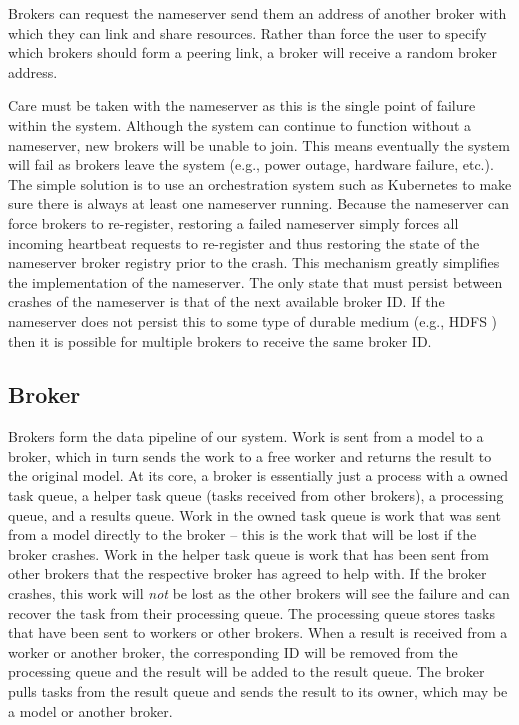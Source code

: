 \documentclass[conference]{IEEEtran}
\begin{document}
Brokers can request the nameserver send them an address of another broker with
which they can link and share resources. Rather than force the user to specify
which brokers should form a peering link, a broker will receive a random broker
address.

Care must be taken with the nameserver as this is the single point of failure
within the system. Although the system can continue to function without a
nameserver, new brokers will be unable to join. This means eventually the system
will fail as brokers leave the system (e.g., power outage, hardware failure, etc.).
The simple solution is to use an orchestration system such as Kubernetes to make
sure there is always at least one nameserver running. Because the nameserver
can force brokers to re-register, restoring a failed nameserver simply forces all
incoming heartbeat requests to re-register and thus restoring the state of the
nameserver broker registry prior to the crash. This mechanism greatly simplifies
the implementation of the nameserver. The only state that must persist between
crashes of the nameserver is that of the next available broker ID. If the nameserver
does not persist this to some type of durable medium (e.g., HDFS
\cite{Shvachko:2010:HDF:1913798.1914427}) then it is possible for multiple brokers
to receive the same broker ID.


\subsection{Broker}
Brokers form the data pipeline of our system. Work is sent from a model to a broker,
which in turn sends the work to a free worker and returns the result to the original
model. At its core, a broker is essentially just a process with a owned task queue,
a helper task queue (tasks received from other brokers), a processing queue, and
a results queue. Work in the owned task queue is work that was sent from a model directly
to the broker -- this is the work that will be lost if the broker crashes. Work in
the helper task queue is work that has been sent from other brokers that the respective
broker has agreed to help with. If the broker crashes, this work will \emph{not} be
lost as the other brokers will see the failure and can recover the task from their
processing queue. The processing queue stores tasks that have been sent to
workers or other brokers. When a result is received from a worker or another broker,
the corresponding ID will be removed from the processing queue and the result will
be added to the result queue. The broker pulls tasks from the result queue and sends
the result to its owner, which may be a model or another broker.
\end{document}
